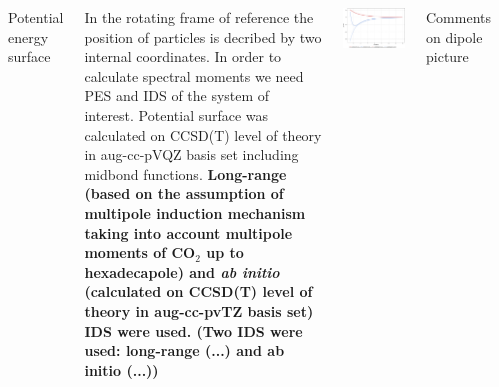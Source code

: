 \documentclass[
  20pt,
  a0paper,
  portrait,
  margin=0mm,
  innermargin=15mm,
  blockverticalspace=0mm,
  colspace=0mm,
  subcolspace=0mm
]{tikzposter}
\begin{document}
\begin{columns}
{{\begin{minipage}{0.5\linewidth}
\begin{tikzfigure}
		\label{fig:coordsys}
\end{tikzfigure}
\end{minipage}
\begin{minipage}{0.5\linewidth}
\begin{center}
	Potential energy surface
\end{center}
\end{minipage}

In the rotating frame of reference the position of particles is decribed by two internal coordinates. In order to calculate spectral moments we need PES and IDS of the system of interest. Potential surface was calculated on CCSD(T) level of theory in aug-cc-pVQZ basis set including midbond functions. \textbf{Long-range (based on the assumption of multipole induction mechanism taking into account multipole moments of CO$_2$ up to hexadecapole) and \textit{ab initio} (calculated on CCSD(T) level of theory in aug-cc-pvTZ basis set) IDS were used. (Two IDS were used: long-range (...) and ab initio (...))} \\
\vspace{0.5cm}
\begin{minipage}{0.5\linewidth}
\vspace{1cm}
\begin{tikzfigure}
		\includegraphics[width=\linewidth]{../pictures/dipole_pictures/last-crop.pdf}
\end{tikzfigure}
\end{minipage}
\begin{minipage}{0.5\linewidth}
		\begin{center}
				Comments on dipole picture
		\end{center}
\end{minipage}

}}
\end{columns}
\end{document}
